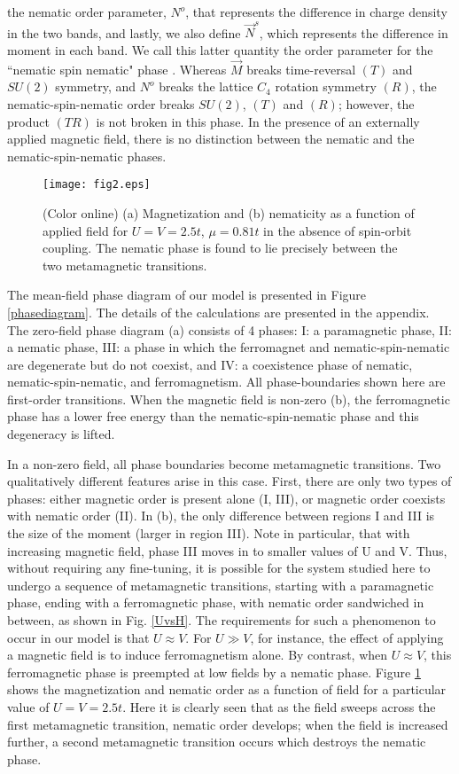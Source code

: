 \documentclass[prb,aps,amssymb,showpacs,twocolumn,amsmath,floatfix]{revtex4}
\begin{document}
the nematic order parameter,  $N^o$,  that represents the difference in charge density in the 
two bands, and lastly, we also define $\vec{N}^s$, which represents the difference in moment in each 
band.  We call this latter quantity the order parameter for the ``nematic spin nematic" phase \cite{Kivelson2003}.  
Whereas  $\vec{M}$ breaks time-reversal $(T)$ and $SU(2)$ symmetry,  and $N^o$ breaks the lattice 
$C_4$ rotation symmetry $(R)$, the nematic-spin-nematic order breaks $SU(2)$,  $(T)$ and $(R)$;  
however, the product $(TR)$ is not broken in this phase.  In the presence of an 
externally applied magnetic field, there is no distinction between the nematic and the nematic-spin-nematic phases.   
\begin{figure}
\texttt{[image: fig2.eps]}
\caption{ (Color online) (a) Magnetization and (b) nematicity as a function of applied field for $U=V=2.5t$, $\mu = 0.81t$
in the absence of spin-orbit coupling.  
The nematic phase is found to lie precisely between the 
two metamagnetic transitions.   }
   \label{fig2}
\end{figure} 

The mean-field phase diagram of our model is presented in Figure \ref{phasediagram}.  The 
details of the calculations are presented in the appendix.  The zero-field 
phase diagram (a) consists of 4 phases:  I: a paramagnetic phase, II: a nematic phase, III: a phase in 
which the ferromagnet and nematic-spin-nematic are degenerate but do not coexist, and IV: a 
coexistence phase of nematic, nematic-spin-nematic, and ferromagnetism.  All phase-boundaries 
shown here are first-order transitions.  
When the magnetic field is non-zero (b), the ferromagnetic phase has a lower free energy 
than the nematic-spin-nematic phase and this degeneracy is lifted.  

In a non-zero field, all phase boundaries 
become metamagnetic transitions.  Two qualitatively different features arise in this case.  First, there 
are only two types of phases: either magnetic order is present alone (I, III), or magnetic order coexists 
with nematic order (II).  In (b), the only difference between regions I and III is the size of the moment 
(larger in region III).  Note in particular, that with increasing magnetic field, phase III moves in to smaller 
values of U and V.  Thus, without requiring any fine-tuning, it is possible for the system studied here to 
undergo a sequence of metamagnetic transitions, starting with a paramagnetic phase, ending with a 
ferromagnetic phase, with nematic order sandwiched in between, as shown in Fig. \ref{UvsH}.   The requirements for such a 
phenomenon to occur in our model is that $U \approx V$.  For $U \gg V$, for instance, 
the effect of applying a magnetic field is to induce ferromagnetism alone.  By contrast, when 
$U \approx V$, this ferromagnetic phase is preempted at low fields by a nematic phase.  
Figure \ref{fig2} shows the magnetization and nematic order as a function of field for  a particular 
value of $U=V=2.5t$.  Here it is clearly seen that as the field sweeps across the first metamagnetic 
transition, nematic order develops; when the field is increased further, a second metamagnetic 
transition occurs which destroys the nematic phase.  
\end{document}
